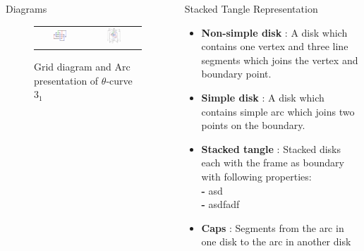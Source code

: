 \documentclass[final]{beamer}
\begin{document}
\begin{frame}[t]
\begin{columns}[t]
\begin{block}{Diagrams}
\begin{Diagrams}
      \begin{figure}[h]
        \centering
        \begin{tabular}{cc}
          \includegraphics[width=0.3\textwidth]{figure/grid.png} &
          \includegraphics[width=0.3\textwidth]{figure/openbook.png} \\
        \end{tabular}
        \caption{Grid diagram and Arc presentation of $\theta$-curve $3_1$}
      \end{figure}
    \end{Diagrams}

  \end{block}
  \begin{block}{Stacked Tangle Representation}

  \begin{itemize}
    \item \textbf{Non-simple disk} : A disk which contains one vertex and three line segments which joins the vertex and boundary point. 
    \item \textbf{Simple disk} : A disk which contains simple arc which joins two points on the boundary.
    \item \textbf{Stacked tangle} : Stacked disks each with the frame as boundary with following properties: \\
    \textbf{-} asd \\
    \textbf{-} asdfadf\\
    \item \textbf{Caps} : Segments from the arc in one disk to the arc in another disk
  \end{itemize}


\end{block}
\end{columns}
\end{frame}
\end{document}
